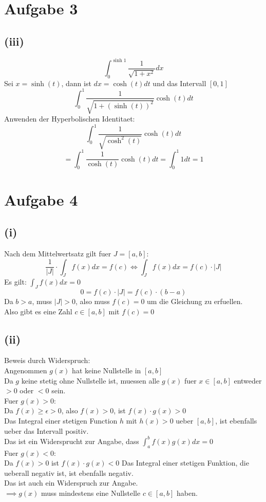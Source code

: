 \documentclass{article}
\begin{document}
\section*{Aufgabe 3}
\subsection*{(iii)}
\[\int_0^{\sinh 1} \frac{1}{\sqrt{1+x^2}} dx\]
Sei $x = \sinh(t)$, dann ist $dx = \cosh(t)dt$ und das Intervall $[0, 1]$\\
\[\int_0^{1} \frac{1}{\sqrt{1+(\sinh(t))^2}} \cosh(t)dt\]
Anwenden der Hyperbolischen Identitaet:
\[\int_0^1 \frac{1}{\sqrt{\cosh^2(t)}} \cosh(t)dt \]
\[= \int_0^1 \frac{1}{\cosh(t)} \cosh(t)dt = \int_0^1 1 dt = 1\]

\section*{Aufgabe 4}
\subsection*{(i)}
Nach dem Mittelwertsatz gilt fuer $J = [a,b]$:
\[\frac{1}{|J|} \cdot \int_{J} f(x)dx =  f(c) \Longleftrightarrow \int_J f(x) dx = f(c) \cdot |J| \]
Es gilt: $\int_J f(x) dx = 0$
\[0 = f(c) \cdot |J| = f(c) \cdot (b - a)\]
Da $b > a$, muss $|J| > 0$, also muss $f(c) = 0$ um die Gleichung zu erfuellen.  \\
Also gibt es eine Zahl $c \in [a, b]$ mit $f(c) = 0$

\subsection*{(ii)}
Beweis durch Widerspruch: \\ 
Angenommen $g(x)$ hat keine Nullstelle in $[a,b]$ \\
Da $g$ keine stetig ohne Nullstelle ist, muessen alle $g(x)$ fuer $x \in [a,b]$ entweder $> 0$ oder $< 0$ sein. \\
\newline
Fuer $g(x) > 0$: \\
Da $f(x) \geq \epsilon > 0$, also $f(x) > 0$, ist $f(x) \cdot g(x) > 0$ \\
Das Integral einer stetigen Function $h$ mit $h(x) > 0$ ueber $[a,b]$, ist ebenfalls ueber das Intervall positiv. \\
Das ist ein Widersprucht zur Angabe, dass $\int_{a}^{b}f(x)g(x)dx = 0$ \\
\newline
Fuer $g(x) < 0$: \\
Da $f(x) > 0$ ist $f(x) \cdot g(x) < 0$
Das Integral einer stetigen Funktion, die ueberall negativ ist, ist ebenfalls negativ. \\
Das ist auch ein Widerspruch zur Angabe. \\
\newline
$\implies g(x)$ muss mindestens eine Nullstelle $c \in [a,b]$ haben. 
\end{document}
